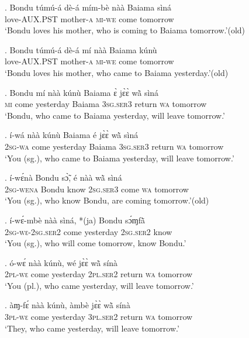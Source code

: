 \documentclass{assets/fieldnotes}
\begin{document}

\exg. Bondu túmú-á dè-á mím-bè nàà Baiama sìná \\
{} love-\textsc{AUX.PST} mother-\textsc{a} \textsc{mi-we} come {} tomorrow\\
`Bondu loves his mother, who is coming to Baiama tomorrow.’\hfill{(old)}

\exg. Bondu túmú-á dè-á mí nàà Baiama kúnù\\
{} love-\textsc{AUX.PST} mother-\textsc{a} \textsc{mi-we} come {} tomorrow\\
`Bondu loves his mother, who came to Baiama yesterday.’\hfill{(old)}

\exg. Bondu mí nàà kúnù Baiama ɛ̀ jɛ̀ɛ̀ wã̀ sìná \\
{} \textsc{mi} come yesterday Baiama \textsc{3sg.ser3} return \textsc{wa} tomorrow\\
`Bondu, who came to Baiama yesterday, will leave tomorrow.’

\exg. í-wá nàà kúnù Baiama é jɛ̀ɛ̀ wã̀ sìná\\
\textsc{2sg-wa} come yesterday Baiama \textsc{3sg.ser3} return \textsc{wa} tomorrow\\
`You (sg.), who came to Baiama yesterday, will leave tomorrow.’

\exg. í-wɛ́nà Bondu sɔ̃̀, é nàà wã̀ sìná\\
\textsc{2sg}-\textsc{wena} Bondu know \textsc{2sg.ser3} come \textsc{wa} tomorrow\\
`You (sg.), who know Bondu, are coming tomorrow.’\hfill{(old)}

\exg. í-wɛ́-mbè nàà sìná, *(ja) Bondu sɔ́ɱfã̀\\
\textsc{2sg-wɛ-2sg.ser2} come yesterday \textsc{2sg.ser2} {} know\\
`You (sg.), who will come tomorrow, know Bondu.’

\exg. ó-wɛ́ nàà kúnù, wé jɛ̀ɛ̀ wã̀ sínà \\
\textsc{2pl-wɛ} come yesterday \textsc{2pl.ser2} return \textsc{wa} tomorrow\\
`You (pl.), who came yesterday, will leave tomorrow.’

\exg. àɱ-fɛ́ nàà kúnù, àmbè jɛ̀ɛ̀ wã̀ sínà \\
\textsc{3pl-wɛ} come yesterday \textsc{3pl.ser2} return \textsc{wa} tomorrow\\
`They, who came yesterday, will leave tomorrow.’
\end{document}

